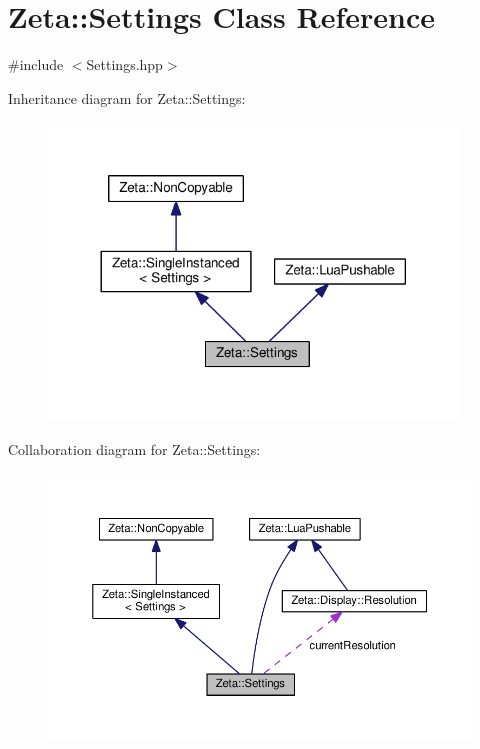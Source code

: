 \hypertarget{classZeta_1_1Settings}{\section{Zeta\+:\+:Settings Class Reference}
\label{classZeta_1_1Settings}
}


{\ttfamily \#include $<$Settings.\+hpp$>$}



Inheritance diagram for Zeta\+:\+:Settings\+:\nopagebreak
\begin{figure}[H]
\begin{center}
\leavevmode
\includegraphics[width=308pt]{classZeta_1_1Settings__inherit__graph}
\end{center}
\end{figure}


Collaboration diagram for Zeta\+:\+:Settings\+:\nopagebreak
\begin{figure}[H]
\begin{center}
\leavevmode
\includegraphics[width=350pt]{classZeta_1_1Settings__coll__graph}
\end{center}
\end{figure}
